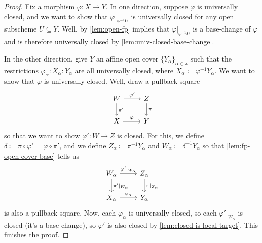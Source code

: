 \documentclass[../notes.tex]{subfiles}
\begin{document}
\begin{proof}
	Fix a morphism $\varphi\colon X\to Y$. In one direction, suppose $\varphi$ is universally closed, and we want to show that $\varphi|_{\varphi^{-1}U}$ is universally closed for any open subscheme $U\subseteq Y$. Well, by \autoref{lem:open-fp} implies that $\varphi|_{\varphi^{-1}U}$ is a base-change of $\varphi$ and is therefore universally closed by \autoref{lem:univ-closed-base-change}.

	In the other direction, give $Y$ an affine open cover $\{Y_\alpha\}_{\alpha\in\lambda}$ such that the restrictions $\varphi_\alpha\colon X_\alpha\colon Y_\alpha$ are all universally closed, where $X_\alpha\coloneqq\varphi^{-1}Y_\alpha$. We want to show that $\varphi$ is universally closed. Well, draw a pullback square
	\[\begin{tikzcd}
		W & Z \\
		X & Y
		\arrow["{\varphi'}", from=1-1, to=1-2]
		\arrow["\varphi", from=2-1, to=2-2]
		\arrow["\pi", from=1-2, to=2-2]
		\arrow["{\pi'}", from=1-1, to=2-1]
	\end{tikzcd}\]
	so that we want to show $\varphi'\colon W\to Z$ is closed. For this, we define $\delta\coloneqq\pi\circ\varphi'=\varphi\circ\pi'$, and we define $Z_\alpha\coloneqq\pi^{-1}Y_\alpha$ and $W_\alpha\coloneqq\delta^{-1}Y_\alpha$ so that \autoref{lem:fp-open-cover-base} tells us
	\[\begin{tikzcd}
		{W_\alpha} & {Z_\alpha} \\
		{X_\alpha} & {Y_\alpha}
		\arrow["{\varphi'|_{W_\alpha}}", from=1-1, to=1-2]
		\arrow["{\varphi_\alpha}", from=2-1, to=2-2]
		\arrow["{\pi|_{Z_\alpha}}", from=1-2, to=2-2]
		\arrow["{\pi'|_{W_\alpha}}", from=1-1, to=2-1]
	\end{tikzcd}\]
	is also a pullback square. Now, each $\varphi_\alpha$ is universally closed, so each $\varphi'|_{W_\alpha}$ is closed (it's a base-change), so $\varphi'$ is also closed by \autoref{lem:closed-is-local-target}. This finishes the proof.
\end{proof}
\end{document}
